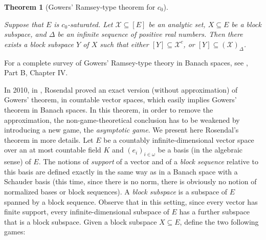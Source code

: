 \documentclass[a4paper,11pt]{article}
\newtheorem{thm}{Theorem}[section]
\theoremstyle{definition}
\numberwithin{equation}{section}
\newcommand{\X}{\mathcal{X}}
\begin{document}
\begin{thm}[Gowers' Ramsey-type theorem for $c_0$]\label{Gowersc0theorem}

Suppose that $E$ is $c_0$-saturated. Let $\X \subseteq [E]$ be an analytic set, $X\subseteq E$ be a block subspace, and $\Delta$ be an infinite sequence of positive real numbers. Then there exists a block subspace $Y$ of $X$ such that either $[Y] \subseteq \X^c$, or $[Y] \subseteq (\X)_\Delta$.

\end{thm}

For a complete survey of Gowers' Ramsey-type theory in Banach spaces, see \cite{todorcevicbleu}, Part B, Chapter IV.

\smallskip

In 2010, in \cite{RosendalGowers}, Rosendal proved an exact version (without approximation) of Gowers' theorem, in countable vector spaces, which easily implies Gowers' theorem in Banach spaces. In this theorem, in order to remove the approximation, the non-game-theoretical conclusion has to be weakened by introducing a new game, the \emph{asymptotic game}. We present here Rosendal's theorem in more details. Let $E$ be a countably infinite-dimensional vector space over an at most countable field $K$ and $(e_i)_{i \in \omega}$ be a basis (in the algebraic sense) of $E$. The notions of \emph{support} of a vector and of a \emph{block sequence} relative to this basis are defined exactly in the same way as in a Banach space with a Schauder basis (this time, since there is no norm, there is obviously no notion of normalized bases or block sequences). A \emph{block subspace} is a subspace of $E$ spanned by a block sequence. Observe that in this setting, since every vector has finite support, every infinite-dimensional subspace of $E$ has a further subspace that is a block subspace. Given a block subspace $X \subseteq E$, define the two following games:
\end{document}
